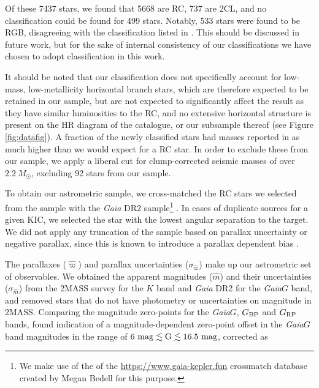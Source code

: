 \documentclass[fleqn,usenatbib]{mnras}
\newcommand{\gaia}{\emph{Gaia}\xspace}
\newcommand{\Ks}{\mbox{$K$}\xspace}
\newcommand{\new}[1]{#1}
\newcommand{\nnew}[1]{#1}
\newcommand{\up}[1]{#1}
\begin{document}
Of these 7437 stars, we found that 5668 are RC, 737 are 2CL, and no classification could be found for  \nnew{499} stars. Notably, 533 stars were found to be RGB, disagreeing with the classification listed in . \new{This should be discussed in future work, but for the sake of \up{internal consistency of our classifications} we have \nnew{chosen to adopt} \cite{art:elsworth+2017} classification in this work.}

It should be noted that our classification does not specifically account for low-mass, low-metallicity horizontal branch stars, which are therefore expected to be retained in our sample, but are not expected to significantly affect the result as they have similar luminosities to the RC, and no extensive horizontal structure is present on the HR diagram of the  catalogue, or our subsample thereof (see Figure \ref{fig:datafig}). A fraction of the newly classified stars had masses reported in  as much higher than we would expect for a RC star. In order to exclude these from our sample, we apply a liberal cut for clump-corrected seismic masses of over $2.2\ M_\odot$, excluding 92 stars from our sample.

To obtain our astrometric sample, we cross-matched the \new{RC stars we selected from the  sample} with the \gaia DR2 sample\footnote{We make use of the of the  \hyperlink{gaia-kelper.fun}{https://www.gaia-kepler.fun} crossmatch database created by Megan Bedell for this purpose.} \citep{art:gaiacollaboration+2016, art:gaiacollaboration+2018}. In cases of duplicate sources for a given KIC, we selected the star with the lowest angular separation to the target. We did not apply any truncation of the sample based on parallax uncertainty or negative parallax, since this is known to introduce a parallax dependent bias \citep{art:luri+2018}. 

The parallaxes ($\hat{\varpi}$) and parallax uncertainties ($\sigma_{\hat{\varpi}}$) make up our astrometric set of observables. We obtained the apparent magnitudes ($\hat{m}$) and their uncertainties ($\sigma_{\hat{m}}$) from the 2MASS survey for the \Ks band \citep{art:skrutskie+2006} and \gaia DR2 for the \gaia $G$ band, and removed stars that do not have photometry or uncertainties on magnitude in 2MASS. \new{Comparing the magnitude zero-points for the \gaia $G$, $G_{\rm{BP}}$ and $G_{\rm{RP}}$ bands, \cite{art:casagrande+vandenberg2018} found indication of a magnitude-dependent zero-point offset in the \gaia $G$ band magnitudes in the range of $6\ \rm{mag} \lesssim G \lesssim 16.5\ \rm{mag}$, corrected as}
\end{document}
